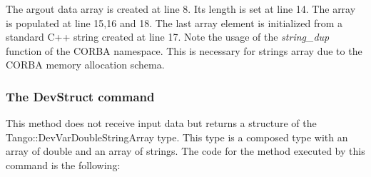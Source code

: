 The argout data array is created at line 8. Its length is set at line
14. The array is populated at line 15,16 and 18. The last array element
is initialized from a standard C++ string created at line 17. Note
the usage of the \emph{string\_dup} function of
the CORBA namespace. This is necessary for strings array due to the
CORBA memory allocation schema.


\subsubsection{The DevStruct command}

This method does not receive input data but returns a structure of
the Tango::DevVarDoubleStringArray
type. This type is a composed type with an array of double and an
array of strings. The code for the method executed by this command
is the following:


